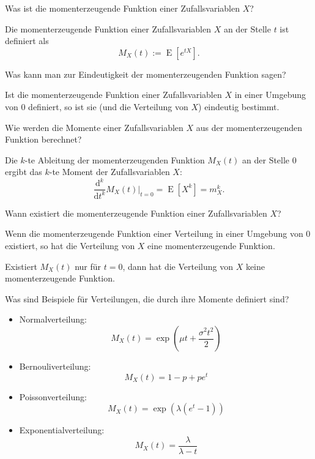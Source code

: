 \begin{QandA}
    \item Was ist die momenterzeugende Funktion einer Zufallsvariablen $X$?
    \begin{answered}
        Die momenterzeugende Funktion einer Zufallsvariablen $X$ an der Stelle $t$ ist definiert als
        \[
            M_X(t) := \operatorname{E}[e^{tX}].
        \]
    \end{answered}

    \item Was kann man zur Eindeutigkeit der momenterzeugenden Funktion sagen?
    \begin{answered}
        Ist die momenterzeugende Funktion einer Zufallsvariablen $X$ in einer Umgebung von $0$ definiert, so ist sie (und die Verteilung von $X$) eindeutig bestimmt.
    \end{answered}

    \item Wie werden die Momente einer Zufallsvariablen $X$ aus der momenterzeugenden Funktion berechnet?
    \begin{answered}
        Die $k$-te Ableitung der momenterzeugenden Funktion $M_X(t)$ an der Stelle $0$ ergibt das $k$-te Moment der Zufallsvariablen $X$:
        \[
            \frac{\mathrm{d}^k}{\mathrm{d}t^k} M_X(t) \Big|_{t=0} = \operatorname{E}[X^k] = m_X^k.
        \]
    \end{answered}

    \item Wann existiert die momenterzeugende Funktion einer Zufallsvariablen $X$?
    \begin{answered}
        Wenn die momenterzeugende Funktion einer Verteilung in einer Umgebung von 0 existiert, so hat die Verteilung von $X$ eine momenterzeugende Funktion.

        Existiert $M_{X}(t)$ nur für $t=0$, dann hat die Verteilung von $X$ keine momenterzeugende Funktion.
    \end{answered}

    \item Was sind Beispiele für Verteilungen, die durch ihre Momente definiert sind?
    \begin{answered}
        \begin{itemize}
            \item Normalverteilung:
                  \[
                      M_X(t) = \exp\left(\mu t + \frac{\sigma^2 t^2}{2}\right)
                  \]
            \item Bernouliverteilung:
                  \[
                      M_X(t) = 1 - p + p e^t
                  \]
            \item Poissonverteilung:
                  \[
                      M_X(t) = \exp(\lambda(e^t - 1))
                  \]
            \item Exponentialverteilung:
                  \[
                      M_X(t) = \frac{\lambda}{\lambda - t}
                  \]
        \end{itemize}
    \end{answered}


\end{QandA}
